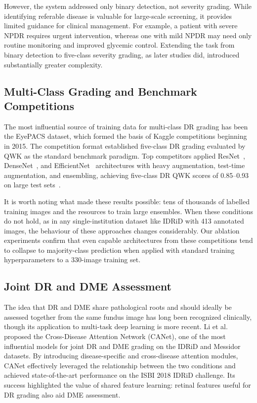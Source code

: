 \documentclass[12pt,a4paper]{article}
\begin{document}
However, the system addressed only binary detection, not severity grading. While identifying referable disease is valuable for large-scale screening, it provides limited guidance for clinical management. For example, a patient with severe NPDR requires urgent intervention, whereas one with mild NPDR may need only routine monitoring and improved glycemic control. Extending the task from binary detection to five-class severity grading, as later studies did, introduced substantially greater complexity.
\newpage
\subsection{Multi-Class Grading and Benchmark Competitions}

The most influential source of training data for multi-class DR grading has been the EyePACS dataset, which formed the basis of Kaggle competitions beginning in 2015. The competition format established five-class DR grading evaluated by QWK as the standard benchmark paradigm. Top competitors applied ResNet~\cite{He2016ResNet}, DenseNet~\cite{Huang2017DenseNet}, and EfficientNet~\cite{Tan2019EfficientNet} architectures with heavy augmentation, test-time augmentation, and ensembling, achieving five-class DR QWK scores of 0.85--0.93 on large test sets~\cite{Qummar2019}.

It is worth noting what made these results possible: tens of thousands of labelled training images and the resources to train large ensembles. When these conditions do not hold, as in any single-institution dataset like IDRiD with 413 annotated images, the behaviour of these approaches changes considerably. Our ablation experiments confirm that even capable architectures from these competitions tend to collapse to majority-class prediction when applied with standard training hyperparameters to a 330-image training set.

\subsection{Joint DR and DME Assessment}

The idea that DR and DME share pathological roots and should ideally be assessed together from the same fundus image has long been recognized clinically, though its application to multi-task deep learning is more recent. Li et al.~\cite{Li2019CANet} proposed the Cross-Disease Attention Network (CANet), one of the most influential models for joint DR and DME grading on the IDRiD and Messidor datasets. By introducing disease-specific and cross-disease attention modules, CANet effectively leveraged the relationship between the two conditions and achieved state-of-the-art performance on the ISBI 2018 IDRiD challenge. Its success highlighted the value of shared feature learning: retinal features useful for DR grading also aid DME assessment.
\end{document}
